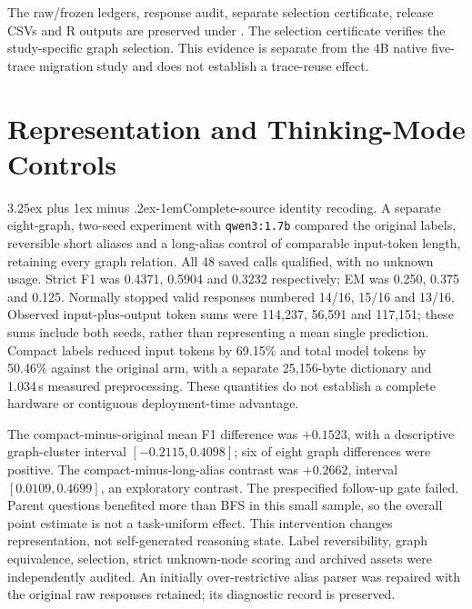 \documentclass[10pt]{article}
\makeatletter
\renewcommand\paragraph{\@startsection{paragraph}{4}{\parindent}%
  {3.25ex plus 1ex minus .2ex}{-1em}{\normalfont\normalsize\bfseries}}
\makeatother
\begin{document}
The raw/frozen ledgers, response audit, separate selection certificate, release CSVs and R outputs are preserved under \protect{}. The selection certificate verifies the study-specific graph selection. This evidence is separate from the 4B native five-trace migration study and does not establish a trace-reuse effect.

\section{Representation and Thinking-Mode Controls}
\label{app:representation-controls}

\paragraph{Complete-source identity recoding.} A separate eight-graph, two-seed experiment with \texttt{qwen3:\allowbreak1.7b} compared the original labels, reversible short aliases and a long-alias control of comparable input-token length, retaining every graph relation. All 48 saved calls qualified, with no unknown usage. Strict F1 was 0.4371, 0.5904 and 0.3232 respectively; EM was 0.250, 0.375 and 0.125. Normally stopped valid responses numbered 14/16, 15/16 and 13/16. Observed input-plus-output token sums were 114,237, 56,591 and 117,151; these sums include both seeds, rather than representing a mean single prediction. Compact labels reduced input tokens by 69.15\% and total model tokens by 50.46\% against the original arm, with a separate 25,156-byte dictionary and 1.034\,s measured preprocessing. These quantities do not establish a complete hardware or contiguous deployment-time advantage.

The compact-minus-original mean F1 difference was $+0.1523$, with a descriptive graph-cluster interval $[-0.2115,0.4098]$; six of eight graph differences were positive. The compact-minus-long-alias contrast was $+0.2662$, interval $[0.0109,0.4699]$, an exploratory contrast. The prespecified follow-up gate failed. Parent questions benefited more than BFS in this small sample, so the overall point estimate is not a task-uniform effect. This intervention changes representation, not self-generated reasoning state. Label reversibility, graph equivalence, selection, strict unknown-node scoring and archived assets were independently audited. An initially over-restrictive alias parser was repaired with the original raw responses retained; its diagnostic record is preserved.
\end{document}
